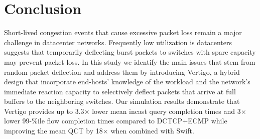 \section{Conclusion}
Short-lived congestion events that cause excessive packet loss remain a major challenge in datacenter networks. Frequently low utilization is datacenters suggests that temporarily deflecting burst packets to switches with spare capacity may prevent packet loss.
In this study we identify the main issues that stem from random packet deflection and address them by introducing Vertigo, a hybrid design that incorporate end-hosts' knowledge of the workload and the network's immediate reaction capacity to selectively deflect packets that arrive at full buffers to the
neighboring switches. Our simulation results demonstrate that Vertigo provides up to 3.3$\times$ lower mean incast query completion times and 3$\times$ lower 99-\%ile flow completion times compared to DCTCP+ECMP while improving the mean QCT by 18$\times$ when combined with Swift. %